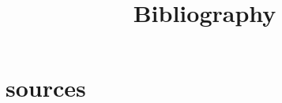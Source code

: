 \documentclass[12pt]{amsart}
\title{Bibliography}
\begin{document}
\section{sources}

\cite{Watts1998}
\cite{Tomlinson1997}
\cite{Hofbauer1998}
\cite{Gerstung2011}
\cite{Durrett2009}
\cite{Durrett1994}
\cite{Dingli2009}
\cite{Bomze1983}
\cite{Basanta2012}
\cite{Basanta2011}
\cite{Basanta2008}
\cite{Bach2003}
\cite{Axelrod2006}
\cite{TomBod}
\cite{Smith1986}
\cite{Smith1982}






\end{document}

